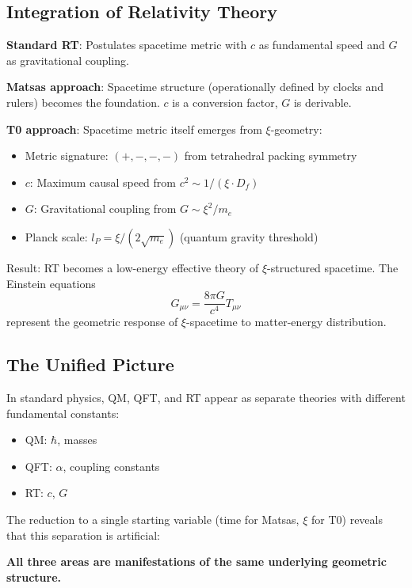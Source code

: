 	\subsection{Integration of Relativity Theory}
	
	\textbf{Standard RT}: Postulates spacetime metric with $c$ as fundamental speed and $G$ as gravitational coupling.
	
	\textbf{Matsas approach}: Spacetime structure (operationally defined by clocks and rulers) becomes the foundation. $c$ is a conversion factor, $G$ is derivable.
	
	\textbf{T0 approach}: Spacetime metric itself emerges from $\xi$-geometry:
	\begin{itemize}
		\item Metric signature: $(+,-,-,-)$ from tetrahedral packing symmetry
		\item $c$: Maximum causal speed from $c^2 \sim 1/(\xi \cdot D_f)$
		\item $G$: Gravitational coupling from $G \sim \xi^2 / m_e$
		\item Planck scale: $l_P = \xi/(2\sqrt{m_e})$ (quantum gravity threshold)
	\end{itemize}
	
	Result: RT becomes a low-energy effective theory of $\xi$-structured spacetime. The Einstein equations
	\[
	G_{\mu\nu} = \frac{8\pi G}{c^4} T_{\mu\nu}
	\]
	represent the geometric response of $\xi$-spacetime to matter-energy distribution.
	
	\subsection{The Unified Picture}
	
	In standard physics, QM, QFT, and RT appear as separate theories with different fundamental constants:
	\begin{itemize}
		\item QM: $\hbar$, masses
		\item QFT: $\alpha$, coupling constants
		\item RT: $c$, $G$
	\end{itemize}
	
	The reduction to a single starting variable (time for Matsas, $\xi$ for T0) reveals that this separation is artificial:
	
	\begin{insight}
		\textbf{All three areas are manifestations of the same underlying geometric structure.}
	\end{insight}
	
